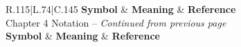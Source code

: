 \documentclass[../dissertation.tex]{subfiles}
\begin{document}
\begin{centering}
\begin{longtable}{R{.115\textwidth}|L{.74\textwidth}|C{.145\textwidth}}
	\textbf{Symbol} & \textbf{Meaning} & \textbf{Reference} \\
	\hline                                      
	\endfirsthead
	{Chapter 4 Notation -- \textit{Continued from previous page}} \\
	\hline
	\textbf{Symbol} & \textbf{Meaning} & \textbf{Reference} \\
	\hline
	\endhead
	\hline {} \\
	\endfoot
	\hline
	\endlastfoot

\end{longtable}
\end{centering}
\end{document}
